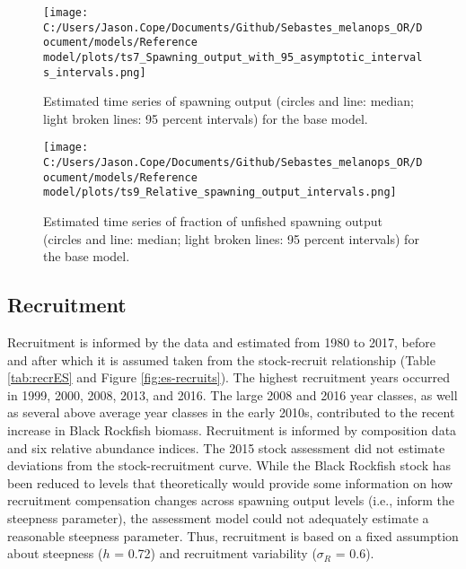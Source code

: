 \documentclass[11pt,
  english,
  letterpaper,
]{article}
\begin{document}


\begin{figure}
\centering
\texttt{[image: C:/Users/Jason.Cope/Documents/Github/Sebastes\_melanops\_OR/Document/models/Reference model/plots/ts7\_Spawning\_output\_with\_95\_asymptotic\_intervals\_intervals.png]}
\caption{Estimated time series of spawning output (circles and line: median; light broken lines: 95 percent intervals) for the base model.\label{fig:es-ssb}}
\end{figure}

\begin{figure}
\centering
\texttt{[image: C:/Users/Jason.Cope/Documents/Github/Sebastes\_melanops\_OR/Document/models/Reference model/plots/ts9\_Relative\_spawning\_output\_intervals.png]}
\caption{Estimated time series of fraction of unfished spawning output (circles and line: median; light broken lines: 95 percent intervals) for the base model.\label{fig:es-depl}}
\end{figure}

\clearpage

\hypertarget{recruitment}{%
\subsection*{Recruitment}\label{recruitment}}

Recruitment is informed by the data and estimated from 1980 to 2017, before and after which it is assumed taken from the stock-recruit relationship (Table \ref{tab:recrES} and Figure \ref{fig:es-recruits}). The highest recruitment years occurred in 1999, 2000, 2008, 2013, and 2016. The large 2008 and 2016 year classes, as well as several above average year classes in the early 2010s, contributed to the recent increase in Black Rockfish biomass. Recruitment is informed by composition data and six relative abundance indices. The 2015 stock assessment did not estimate deviations from the stock-recruitment curve. While the Black Rockfish stock has been reduced to levels that theoretically would provide some information on how recruitment compensation changes across spawning output levels (i.e., inform the steepness parameter), the assessment model could not adequately estimate a reasonable steepness parameter. Thus, recruitment is based on a fixed assumption about steepness (\(h\) = 0.72) and recruitment variability (\(\sigma_R\) = 0.6).
\end{document}
